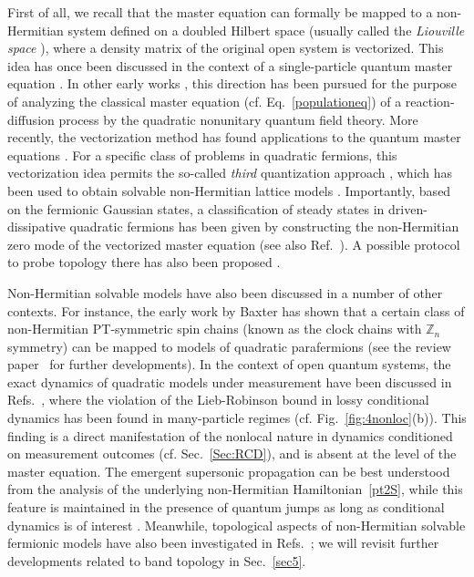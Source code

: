 \documentclass{tADP2e}
\theoremstyle{plain}
\theoremstyle{plain}
\theoremstyle{definition}
\begin{document}
First of all, we recall that the master equation can formally be mapped to a non-Hermitian system defined on a doubled Hilbert space {(usually called the \emph{Liouville space} \cite{EM09})}, where a density matrix of the original open system is vectorized. This idea has once been discussed in the context of a single-particle quantum master equation \cite{FWR90}. In other early works \cite{MMA97,OG04}, this direction  has been pursued for the purpose of analyzing the classical master equation (cf. Eq.~\eqref{populationeq}) of a reaction-diffusion process by the quadratic nonunitary quantum field theory. More recently, the vectorization method has found applications to the quantum master equations \cite{PT12,PA19,HJ20}. For a specific class of problems in quadratic fermions, this vectorization idea permits the so-called {\it third} quantization approach \cite{PT08}, which has been used to obtain solvable non-Hermitian lattice models \cite{SN19,SN19b}. Importantly, based on the fermionic Gaussian states, a classification of steady states in driven-dissipative quadratic fermions has been given by constructing the non-Hermitian zero mode of the vectorized master equation \cite{CEB2013} (see also Ref.~\cite{LS20}). A possible protocol to probe topology there has also been proposed \cite{CEB2018}. 


Non-Hermitian solvable models have also been discussed in a number of other contexts. For instance, the early work by Baxter has shown that a certain class of non-Hermitian PT-symmetric spin chains (known as the clock chains with $\mathbb{Z}_n$ symmetry) can be mapped to models of quadratic parafermions \cite{BRJ892,RJB89} (see the review paper~\cite{Fendley_2014} for further developments). In the context of open quantum systems, the exact dynamics of quadratic models under measurement have been discussed in Refs.~\cite{YA18,DB19}, where the violation of the Lieb-Robinson bound in lossy conditional dynamics has been found in many-particle regimes (cf. Fig.~\ref{fig:4nonloc}(b)).
This finding is a direct manifestation of the nonlocal nature in dynamics conditioned on measurement outcomes (cf. {Sec.~\ref{Sec:RCD}}), and is absent at the level of the master equation. The emergent supersonic propagation can be best understood from the analysis of the underlying non-Hermitian Hamiltonian~\eqref{pt2S}, while this feature is maintained in the presence of  quantum jumps as long as  conditional dynamics is of interest \cite{YA18}. 
Meanwhile, topological aspects of non-Hermitian solvable fermionic models have also been investigated in Refs.~\cite{ZQB16,KM17,JH182,LE20}; we will revisit further developments related to band topology in Sec.~\ref{sec5}. 
\end{document}
